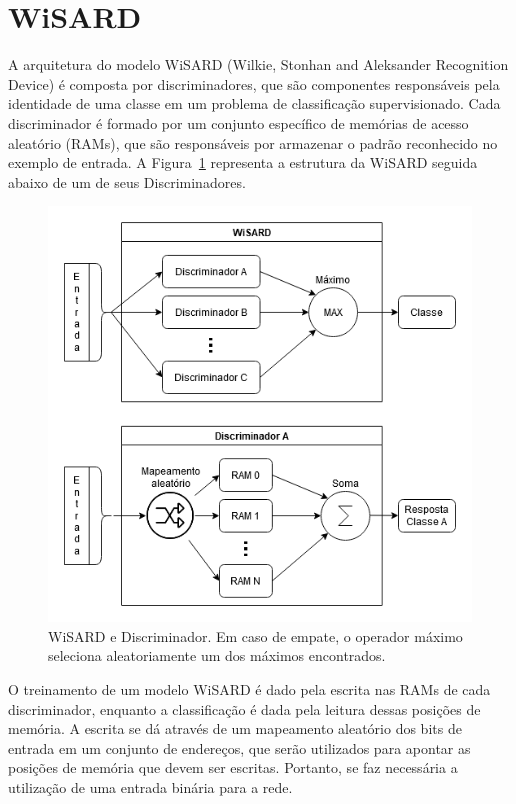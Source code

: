 \section{WiSARD}
A arquitetura do modelo WiSARD (Wilkie, Stonhan and Aleksander Recognition Device) é composta por discriminadores, que são componentes responsáveis pela identidade de uma classe em um problema de classificação supervisionado. Cada discriminador é formado por um conjunto específico de memórias de acesso aleatório (RAMs), que são responsáveis por armazenar o padrão reconhecido no exemplo de entrada. A Figura~\ref{fig:wsd_disc} representa a estrutura da WiSARD seguida abaixo de um de seus Discriminadores.

\begin{figure}[!ht] \label{fig:wsd_disc}
    \centering
    \includegraphics[width=5.0in]{img/wisard_discriminator.png}
    \caption{WiSARD e Discriminador. Em caso de empate, o operador máximo seleciona aleatoriamente um dos máximos encontrados.}
\end{figure}

O treinamento de um modelo WiSARD é dado pela escrita nas RAMs de cada discriminador, enquanto a classificação é dada pela leitura dessas posições de memória. A escrita se dá através de um mapeamento aleatório dos bits de entrada em um conjunto de endereços, que serão utilizados para apontar as posições de memória que devem ser escritas. Portanto, se faz necessária a utilização de uma entrada binária para a rede.

